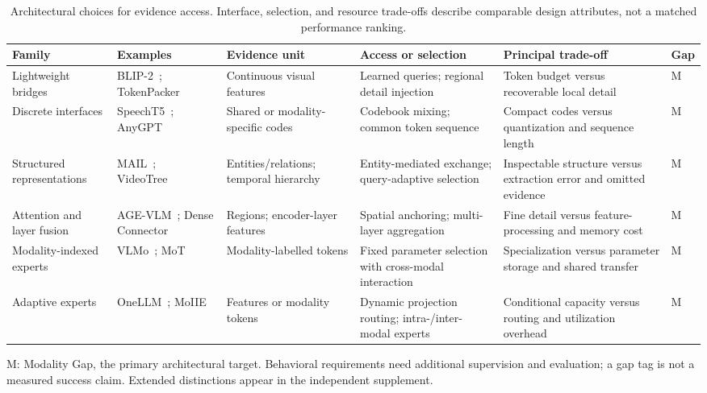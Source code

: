 \begin{table}[t]
\centering
\caption{Architectural choices for evidence access. Interface, selection, and resource trade-offs describe comparable design attributes, not a matched performance ranking.}
\label{tab:architecture-synthesis}
\footnotesize
\setlength{\tabcolsep}{4pt}
\renewcommand{\arraystretch}{1.14}
\begin{tabularx}{\textwidth}{>{\raggedright\arraybackslash}p{}>{\raggedright\arraybackslash}p{}*{3}{>{\raggedright\arraybackslash}X}>{\centering\arraybackslash}p{}}
\toprule
\rowcolor{surveyheader}
\textbf{Family} & \textbf{Examples} & \textbf{Evidence unit} & \textbf{Access or selection} & \textbf{Principal trade-off} & \textbf{Gap} \\
\midrule
Lightweight bridges & BLIP-2~\cite{li2023blip2}; TokenPacker~\cite{li2025tokenpacker} & Continuous visual features & Learned queries; regional detail injection & Token budget versus recoverable local detail & M \\
Discrete interfaces & SpeechT5~\cite{ao2022speecht5}; AnyGPT~\cite{zhan2024anygpt} & Shared or modality-specific codes & Codebook mixing; common token sequence & Compact codes versus quantization and sequence length & M \\
Structured representations & MAIL~\cite{dong2024modality}; VideoTree~\cite{wang2025videotree} & Entities/relations; temporal hierarchy & Entity-mediated exchange; query-adaptive selection & Inspectable structure versus extraction error and omitted evidence & M \\
Attention and layer fusion & AGE-VLM~\cite{mahajan2025attention}; Dense Connector~\cite{yao2024dense} & Regions; encoder-layer features & Spatial anchoring; multi-layer aggregation & Fine detail versus feature-processing and memory cost & M \\
Modality-indexed experts & VLMo~\cite{bao2022vlmo}; MoT~\cite{liang2024mixture} & Modality-labelled tokens & Fixed parameter selection with cross-modal interaction & Specialization versus parameter storage and shared transfer & M \\
Adaptive experts & OneLLM~\cite{han2024onellm}; MoIIE~\cite{wang2025moiie} & Features or modality tokens & Dynamic projection routing; intra-/inter-modal experts & Conditional capacity versus routing and utilization overhead & M \\
\bottomrule
\end{tabularx}
\par\smallskip
{\raggedright\footnotesize M: Modality Gap, the primary architectural target. Behavioral requirements need additional supervision and evaluation; a gap tag is not a measured success claim. Extended distinctions appear in the independent supplement.\par}
\end{table}
